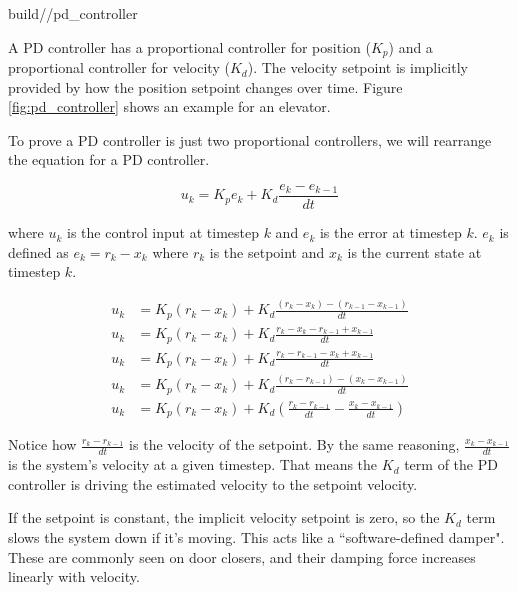 \begin{svg}{build/\chapterpath/pd_controller}
  \caption{PD controller on an elevator}
  \label{fig:pd_controller}
\end{svg}

A PD controller has a proportional controller for position ($K_p$) and a
proportional controller for velocity ($K_d$). The velocity \gls{setpoint} is
implicitly provided by how the position \gls{setpoint} changes over time. Figure
\ref{fig:pd_controller} shows an example for an elevator.

To prove a PD controller is just two proportional controllers, we will rearrange
the equation for a PD controller.

\begin{equation*}
  u_k = K_p e_k + K_d \frac{e_k - e_{k-1}}{dt}
\end{equation*}

where $u_k$ is the \gls{control input} at timestep $k$ and $e_k$ is the
\gls{error} at timestep $k$. $e_k$ is defined as $e_k = r_k - x_k$ where $r_k$
is the \gls{setpoint} and $x_k$ is the current \gls{state} at timestep $k$.

\begin{align*}
  u_k &= K_p (r_k - x_k) + K_d \frac{(r_k - x_k) - (r_{k-1} - x_{k-1})}{dt} \\
  u_k &= K_p (r_k - x_k) + K_d \frac{r_k - x_k - r_{k-1} + x_{k-1}}{dt} \\
  u_k &= K_p (r_k - x_k) + K_d \frac{r_k - r_{k-1} - x_k + x_{k-1}}{dt} \\
  u_k &= K_p (r_k - x_k) + K_d \frac{(r_k - r_{k-1}) - (x_k - x_{k-1})}{dt} \\
  u_k &= K_p (r_k - x_k) + K_d \left(\frac{r_k - r_{k-1}}{dt} -
    \frac{x_k - x_{k-1}}{dt}\right)
\end{align*}

Notice how $\frac{r_k - r_{k-1}}{dt}$ is the velocity of the \gls{setpoint}. By
the same reasoning, $\frac{x_k - x_{k-1}}{dt}$ is the \gls{system}'s velocity at
a given timestep. That means the $K_d$ term of the PD controller is driving the
estimated velocity to the \gls{setpoint} velocity.

If the \gls{setpoint} is constant, the implicit velocity \gls{setpoint} is zero,
so the $K_d$ term slows the \gls{system} down if it's moving. This acts like a
``software-defined damper". These are commonly seen on door closers, and their
damping force increases linearly with velocity.
